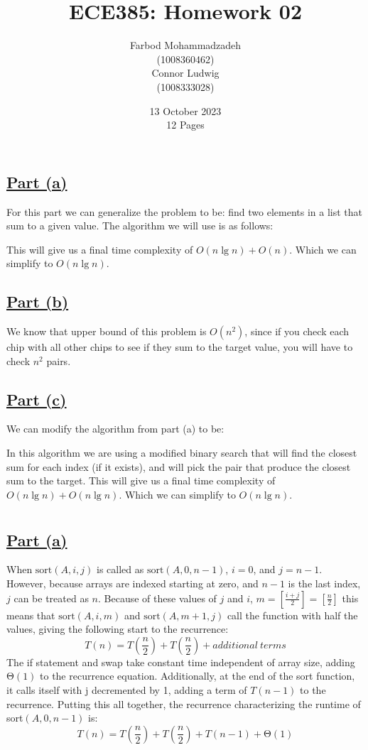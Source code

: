 \documentclass{article}
\title{ECE385: Homework 02}
\author{Farbod Mohammadzadeh\\
    (1008360462)\\
    Connor Ludwig\\
    (1008333028)\\}
\date{13 October 2023\\12 Pages}
\begin{document}
\Large


\maketitle

\newpage

\section{}

\subsection*{\underline{Part (a)}}
For this part we can generalize the problem to be: find two elements in a list that sum to a given value. The algorithm we will use is as follows:

This will give us a final time complexity of $O(n\lg n) + O(n)$. Which we can simplify to $O(n\lg n)$.
\subsection*{\underline{Part (b)}}
We know that upper bound of this problem is $O(n^2)$, since if you check each chip with all other chips to see if they sum to the target value, you will have to check $n^2$ pairs.
\newpage
\subsection*{\underline{Part (c)}}
We can modify the algorithm from part (a) to be:

In this algorithm we are using a modified binary search that will find the closest sum for each index (if it exists), and will pick the pair that produce the closest sum to the target. This will give us a final time complexity of $O(n\lg n) + O(n\lg n)$. Which we can simplify to $O(n\lg n)$.
\newpage
\section{}
\subsection*{\underline{Part (a)}}
When $\text{sort}(A, i, j)$ is called as $\text{sort}(A, 0, n-1)$, $i=0$, and $j=n-1$. However, because arrays are indexed starting at zero, and $n-1$ is the last index, $j$ can be treated as $n$. Because of these values of $j$ and $i$, $m = \left[ \frac{i+j}{2} \right] = \left[ \frac{n}{2} \right]$ this means that $\text{sort}(A, i, m)$ and $\text{sort}(A, m+1, j)$ call the function with half the values, giving the following start to the recurrence:
\[T\left(n\right)=T\left(\frac{n}{2}\right)+T\left(\frac{n}{2}\right)+additional\ terms\]
The if statement and swap take constant time independent of array size, adding $\mathrm{\Theta}(1)$ to the recurrence equation. Additionally, at the end of the sort function, it calls itself with j decremented by 1, adding a term of $T(n-1)$ to the recurrence. Putting this all together, the recurrence characterizing the runtime of sort$(A, 0, n-1)$ is:
\[T\left(n\right)=T\left(\frac{n}{2}\right)+T\left(\frac{n}{2}\right)+T\left(n-1\right)+\mathrm{\Theta}(1)\]
\end{document}
